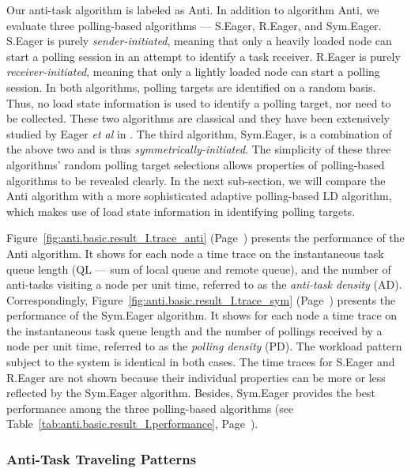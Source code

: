 Our anti-task algorithm is labeled as {\sc Anti}.
In addition to algorithm {\sc Anti},
we evaluate three polling-based algorithms ---
{\sc S.Eager}, {\sc R.Eager}, and {\sc Sym.Eager}.
%
{\sc S.Eager} is purely {\it sender-initiated\/}, 
meaning that only a heavily loaded node can start a polling session
in an attempt to identify a task receiver.
{\sc R.Eager} is purely {\it receiver-initiated\/},
meaning that only a lightly loaded node can start a polling session.
%
In both algorithms, polling targets are identified on a random basis.
Thus, no load state information is used to identify a polling target,
nor need to be collected.
These two algorithms are classical and they have been 
extensively studied by Eager {\it et al\/} in \cite{eager86b}.
%
The third algorithm, {\sc Sym.Eager}, 
is a combination of the above two and is thus {\it symmetri\-cally-initiated\/}.
%
The simplicity of these three algorithms' random polling target selections 
allows properties of polling-based algorithms to be revealed clearly.
In the next sub-section, we will compare the {\sc Anti} algorithm with
a more sophisticated adaptive polling-based LD algorithm, which makes use of
load state information in identifying polling targets.

Figure~\ref{fig:anti.basic.result_I.trace_anti} 
(Page~\pageref{fig:anti.basic.result_I.trace_anti})
presents the performance of the {\sc Anti} algorithm. 
It shows for each node a time trace
on the instantaneous task queue length 
(QL --- sum of local queue and remote queue), and
the number of anti-tasks visiting a node per unit time, 
referred to as the {\it anti-task density\/} (AD).
%
Correspondingly, Figure~\ref{fig:anti.basic.result_I.trace_sym} 
(Page~\pageref{fig:anti.basic.result_I.trace_sym})
presents the performance of the {\sc Sym.Eager} algorithm.
It shows for each node a time trace on
the instantaneous task queue length and the number of pollings 
received by a node per unit time, 
referred to as the {\it polling density\/} (PD).
The workload pattern subject to the system is identical 
in both cases.
% 
The time traces for {\sc S.Eager} and {\sc R.Eager} are not shown because
their individual properties can be more or less reflected
by the {\sc Sym.Eager} algorithm.
Besides, {\sc Sym.Eager} provides the best performance among
the three polling-based algorithms 
(see Table~\ref{tab:anti.basic.result_I.performance}, 
Page~\pageref{tab:anti.basic.result_I.performance}).



\subsubsection{Anti-Task Traveling Patterns}

